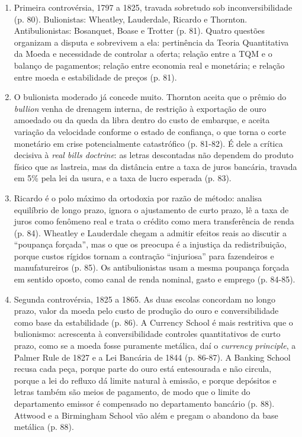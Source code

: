 \begin{enumerate}[leftmargin=*,nosep]
\item Primeira controvérsia, 1797 a 1825, travada sobretudo sob
inconversibilidade (p. 80). Bulionistas: Wheatley, Lauderdale, Ricardo e
Thornton. Antibulionistas: Bosanquet, Boase e Trotter (p. 81). Quatro questões
organizam a disputa e sobrevivem a ela: pertinência da Teoria Quantitativa da
Moeda e necessidade de controlar a oferta; relação entre a TQM e o balanço de
pagamentos; relação entre economia real e monetária; e relação entre moeda e
estabilidade de preços (p. 81).

\item O bulionista moderado já concede muito. Thornton aceita que o prêmio do
\emph{bullion} venha de drenagem interna, de restrição à exportação de ouro
amoedado ou da queda da libra dentro do custo de embarque, e aceita variação da
velocidade conforme o estado de confiança, o que torna o corte monetário em
crise potencialmente catastrófico (p. 81-82). É dele a crítica decisiva à
\emph{real bills doctrine}: as letras descontadas não dependem do produto físico
que as lastreia, mas da distância entre a taxa de juros bancária, travada em 5\%
pela lei da usura, e a taxa de lucro esperada (p. 83).

\item Ricardo é o polo máximo da ortodoxia por razão de método: analisa
equilíbrio de longo prazo, ignora o ajustamento de curto prazo, lê a taxa de
juros como fenômeno real e trata o crédito como mera transferência de renda
(p. 84). Wheatley e Lauderdale chegam a admitir efeitos reais ao discutir a
``poupança forçada'', mas o que os preocupa é a injustiça da redistribuição,
porque custos rígidos tornam a contração ``injuriosa'' para fazendeiros e
manufatureiros (p. 85). Os antibulionistas usam a mesma poupança forçada em
sentido oposto, como canal de renda nominal, gasto e emprego (p. 84-85).

\item Segunda controvérsia, 1825 a 1865. As duas escolas concordam no longo
prazo, valor da moeda pelo custo de produção do ouro e conversibilidade como
base da estabilidade (p. 86). A Currency School é mais restritiva que o
bulionismo: acrescenta à conversibilidade controles quantitativos de curto
prazo, como se a moeda fosse puramente metálica, daí o \emph{currency
principle}, a Palmer Rule de 1827 e a Lei Bancária de 1844 (p. 86-87). A Banking
School recusa cada peça, porque parte do ouro está entesourada e não circula,
porque a lei do refluxo dá limite natural à emissão, e porque depósitos e letras
também são meios de pagamento, de modo que o limite do departamento emissor é
compensado no departamento bancário (p. 88). Attwood e a Birmingham School vão
além e pregam o abandono da base metálica (p. 88).


\end{enumerate}
